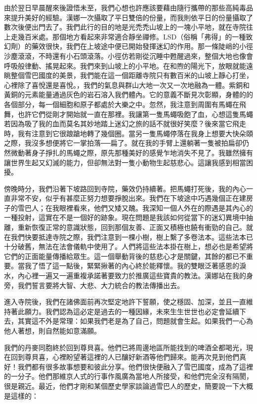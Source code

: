 由於翌日早晨醒來後證悟未至，我們心想也許應該要藉由隨行攜帶的那些高純毒品來提升美好的經驗。漢娜一次攝取了平日雙倍的份量，而我則依平日的份量攝取了數次後便出門去了。我們此行的目的地是光禿禿山坡上的一塊小平地，就在寺院往上走幾百米處。那個地方看起來非常適合靜坐禪修。LSD（俗稱「弗得」的一種致幻劑）的藥效很快，我們在上坡途中便已開始發揮迷幻的作用。那一條陡峭的小徑沙塵滾滾，不時還有小石頭滾落。小徑仿若剛從沉睡中甦醒過來，整個大地也像會呼吸般律動、搖晃起來。我們來到山坡上的小平地。在和煦的陽光下，放眼就能遠眺整個雪巴國度的美景，我們能在這一個距離寺院只有數百米的山坡上靜心打坐，心裡除了喜悅還是喜悅。，我們的氣息與群山大地一次又一次地融為一體。紫銅和黃銅的元素能量通過灰色的岩石溶入我們體內。它的意義不斷見次彰顯，身體的的各個部分，每一個細胞和原子都處於大樂之中。忽然，我注意到周圍有馬蠅在飛舞，也許它們從剛才開始就一直在那裡。我讓第一隻馬蠅吸飽了血，心想這隻馬蠅若因為吸了我的血而莫名其妙地踏上迷幻之旅的話不就很好笑麼？後來當它飛走時，我有注意到它很踉蹌地轉了幾個圈。當另一隻馬蠅停落在我身上想要大快朵頤之際，我沒多想便將它一掌拍落──扁了。就在我的手臂上還躺著一隻被拍扁卻仍然微動著身子掙扎的馬蠅之際，原先那種美好的感覺乍地消失不見了。我雖然擁有讓世界生起又幻滅的能力，但卻無法對一隻小動物生起慈悲心。這讓我感到相當困擾。

傍晚時分，我們沿著下坡路回到寺院，藥效仍持續著。把馬蠅打死後，我的內心一直非常不安，似乎有甚麼正努力想要掙脫出來。我們在下坡途中巧遇幾個正在建房子的雪巴人；在我眼裡看來，他們又矮又醜。我深知一個人外在的際遇是其內心的一種投射，這實在不是一個好的跡象。現在問題是我該如何從當下的迷幻異境中抽離，重新恢復正常的意識狀態，回到那個友善、正面又積極也饒有衝勁的自己。就在我們快要抵達寺院之際，我們注意到一棵小樹，樹上繫了多卷法本。這些法本已十分破舊，無法在法會儀軌中使用了。人們將這些法本掛在樹上，想必也是希望將它們的正面能量傳播給眾生。這一個舉動背後的慈悲心才是關鍵，其餘的都已不重要。當我了悟了這一點後，緊緊揪著的內心終於能釋懷。我的雙眼泛著感恩的淚水，內心裡一遍又一遍重複承諾著要致力於推廣這些寶貴的教法。漢娜站在我的身旁，我們誓言要將大智、大悲、大力統合的教法傳播出去。

進入寺院後，我們在諸佛面前再次堅定地許下誓願，使之穩固、加深，並且一直維持著此願力。我們認為這必定是過去的一種因緣，未來生生世世也必定會延續下去，其實這不外是常理：如果我們老是為了自己，問題就會生起。如果我們一心為他人著想，則自然能如意滿願。

我們的丹麥同胞終於回到尊貝喜。他們已將周邊地區所能找到的啤酒全都喝光，現在回到尊貝喜，心裡盼望著這裡的人已釀好新酒等他們歸來。能再次見到他們真好！我們都有很多故事想要和彼此分享。他們很快便融入了雪巴國度，成為了這裡的一分子。他們那維京人式的行事作風廣為當地人所接受，和他們完全沒有隔閡，很是親近。最近，他們才剛和某個歷史學家談論過雪巴人的歷史，簡要說一下大概是這樣的：

